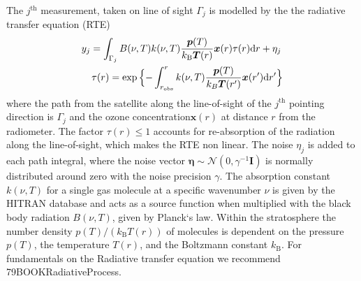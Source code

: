 The $j^\text{th}$ measurement, taken on line of sight $\Gamma_j$  is modelled by the the radiative transfer equation (RTE)~\cite{united2006handbook}
\begin{align}
	y_j =   \int_{\Gamma_j}  B(\nu,T) k(\nu, T)   \frac{\bm{p}(T)}{k_{\text{B}} \bm{T}(r)}  \bm{x}(r)  \tau(r) \text{d}r + \eta_j \, \\
	\tau(r) = \exp{ \Bigl\{ - \int^{r}_{r_\text{obs}}  k(\nu, T)   \frac{\bm{p}(T)}{k_B \bm{T}(r^{\prime})}  \bm{x}(r^{\prime}) \text{d}r^{\prime} \Bigr\} }
	\label{eq:RTE}
\end{align}
where the path from the satellite along the line-of-sight of the $j^\text{th}$ pointing direction is $\Gamma_j$ and the ozone concentration$\bm{x}(r)$ at distance $r$ from the radiometer.
The factor $\tau(r)\leq 1$ accounts for re-absorption of the radiation along the line-of-sight, which makes the RTE non linear.
The noise $\eta_j$ is added to each path integral, where the noise vector $ \bm{\eta} \sim \mathcal{N}(0, \gamma^{-1} \mathbf{I} )$ is normally distributed around zero with the noise precision $\gamma$.
The absorption constant $k(\nu, T)$ for a single gas molecule at a specific wavenumber $\nu$ is given by the HITRAN database \cite{gordon2022hitran2020} and acts as a source function when multiplied with the black body radiation $B(\nu,T)$, given by Planck`s law.
Within the stratosphere the number density $p(T) / (k_{\text{B}} T(r))$ of molecules is dependent on the pressure $p(T)$, the temperature $T(r)$, and the Boltzmann constant $k_{\text{B}}$.
For fundamentals on the Radiative transfer equation we recommend 79BOOKRadiativeProcess.

